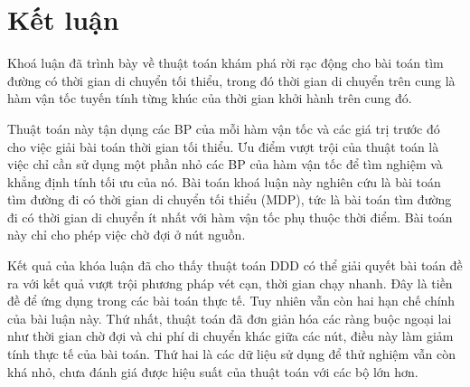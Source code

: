 \documentclass[../main.tex]{subfiles}
\begin{document}
\chapter{Kết luận}\label{kux1ebft-luux1eadn}

Khoá luận đã trình bày về thuật toán khám phá rời rạc động cho bài toán tìm đường có thời gian di chuyển tối thiểu, trong đó thời gian di chuyển trên cung là hàm vận tốc tuyến tính từng khúc của thời gian khởi hành trên cung đó. 

Thuật toán này tận dụng các BP của mỗi hàm vận tốc và các giá trị trước đó cho việc giải bài toán thời gian tối thiểu. Ưu điểm vượt trội của thuật toán là việc chỉ cần sử dụng một phần nhỏ các BP của hàm vận tốc để tìm nghiệm và khẳng định tính tối ưu của nó. 
Bài toán khoá luận này nghiên cứu là bài toán tìm đường đi có thời gian di chuyển tối thiểu (MDP), tức là bài toán tìm đường đi có thời gian di chuyển ít nhất với hàm vận tốc phụ thuộc thời điểm. Bài toán này chỉ cho phép việc chờ đợi ở nút nguồn.

Kết quả của khóa luận đã cho thấy thuật toán DDD có thể giải quyết bài toán đề ra với kết quả vượt trội phương pháp vét cạn, thời gian chạy nhanh. Đây là tiền đề để ứng dụng trong các bài toán thực tế. 
Tuy nhiên vẫn còn hai hạn chế chính của bài luận này. 
Thứ nhất, thuật toán đã đơn giản hóa các ràng buộc ngoại lai như thời gian chờ đợi và chi phí di chuyển khác giữa các nút, điều này làm giảm tính thực tế của bài toán. 
Thứ hai là các dữ liệu sử dụng để thử nghiệm vẫn còn khá nhỏ, chưa đánh giá được hiệu suất của thuật toán với các bộ lớn hơn. 


\end{document}
